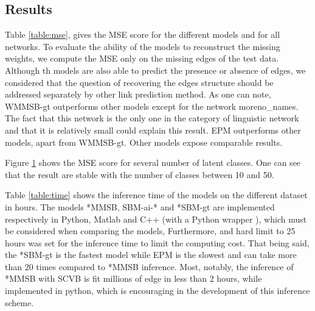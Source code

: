 \begin{table*}[t]
\centering
	
\label{table:mse}
\end{table*}

\subsection{Results}



Table \ref{table:mse}, gives the MSE score for the different models and for all networks. To evaluate the ability of the models to reconstruct the missing weights, we compute the MSE only on the missing edges of the test data. Although th models are also able to predict the presence or absence of edges,  we considered that the question of recovering the edges structure should be addressed separately by other link prediction method. 
As one can note, WMMSB-gt outperforms other models except for the network moreno\_names. 
The fact that this network is the only one in the category of linguistic network and that it is relatively small could explain this result. EPM outperforms other models, apart from WMMSB-gt. Other models expose comparable results.

 

\begin{figure}[h]
\centering
	
   \label{fig:k_evolv}
\end{figure}

Figure \ref{fig:k_evolv} shows the MSE score for several number of latent classes. One can see that the result are stable with the number of classes between 10 and 50.

\begin{table*}[t]
\centering
	
\label{table:time}
\end{table*}

Table \ref{table:time} shows the inference time of the models on the different dataset in hours. The models *MMSB, SBM-ai-* and *SBM-gt are implemented respectively in Python, Matlab and C++ (with a Python wrapper \cite{peixoto_graph-tool_2014}), which must be considered when comparing the models, Furthermore, and hard limit to 25 hours was set for the inference time to limit the computing cost. That being said, the *SBM-gt is the fastest model while EPM is the slowest and can take more than 20 times compared to *MMSB inference. Most, notably, the inference of *MMSB with SCVB is fit millions of edge in less than 2 hours, while implemented in python, which is encouraging in the development of this inference scheme.


